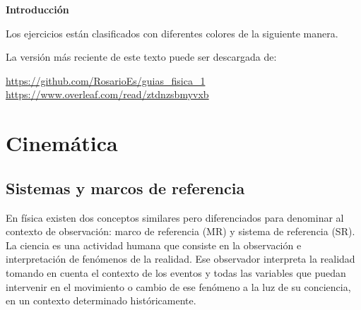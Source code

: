 \documentclass[a4paper,12pt,twoside]{book}
\begin{document}
\clearpage
\noindent
\textbf{Introducción}

Los ejercicios están clasificados con diferentes colores de la siguiente manera.

\begin{mdframed}[style=ejercicio-conceptual]
\end{mdframed}

\begin{mdframed}[style=ejercicio-facil]
\end{mdframed}

\begin{mdframed}[style=ejercicio-intermedio]
\end{mdframed}

\begin{mdframed}[style=ejercicio-dificil]
\end{mdframed}

La versión más reciente de este texto puede ser descargada de:
\begin{center}
    \url{https://github.com/RosarioEs/guias_fisica_1}
    \\[1ex]
    \url{https://www.overleaf.com/read/ztdnzsbmyvxb}
\end{center}


\tableofcontents

\mainmatter
{}


\chapter{Cinemática}


\section{Sistemas y marcos de referencia}

\begin{mdframed}[style=explicacion]
    En física existen dos conceptos similares pero diferenciados para denominar al contexto de observación: marco de referencia (MR) y sistema de referencia (SR). 
    La ciencia es una actividad humana que consiste en la observación e interpretación de fenómenos de la realidad. Ese observador interpreta la realidad tomando en cuenta el contexto de los eventos y todas las variables que puedan intervenir en el movimiento o cambio de ese fenómeno a la luz de su conciencia, en un contexto determinado históricamente.
\end{mdframed}
\end{document}
